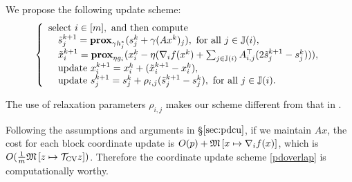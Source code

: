 {{{%
We propose the following  update scheme:
\begin{equation}
\left\{
\begin{array}{l}
\text{select }i\in[m], \text{ and then compute}\\
\quad\tilde{s}_j^{k+1}=\prox_{\gamma h_j^*} (s_j^k+\gamma (Ax^k)_j),~\mbox{for all}~ j\in\JJ(i),\\
\quad\tilde{x}_i^{k+1}=\prox_{\eta g_i}(x_i^k-\eta(\nabla_i f(x^k)+\sum_{j\in\JJ(i)}A_{i,j}^\top(2\tilde{s}_j^{k+1}-s_j^k))),\\
\quad\text{update }x_i^{k+1}=x_i^k+(\tilde{x}_i^{k+1}-x_i^k), \\
\quad\text{update }s_j^{k+1}=s_j^k+\rho_{i,j}(\tilde{s}_j^{k+1}-s_j^k),~\mbox{for all}~ j\in\JJ(i).
\end{array}
\right.\label{pdoverlap}
\end{equation}
\begin{remark}
The use of relaxation parameters $\rho_{i,j}$ makes our scheme different from that in \cite{pesquet2014class}. %
\end{remark}
Following the assumptions and arguments in \S$\ref{sec:pdcu}$, if we maintain $Ax$, the cost for each block coordinate update is $O(p)+\mathfrak{M}\left[{x}\mapsto {\nabla_i f(x)}\right]$, which is $O(\frac{1}{m}\mathfrak{M}\left[{z}\mapsto {{{\mathcal{T}}_{\textnormal{CV}}}z}\right])$. Therefore the coordinate update scheme \eqref{pdoverlap} is computationally worthy.

}}}
